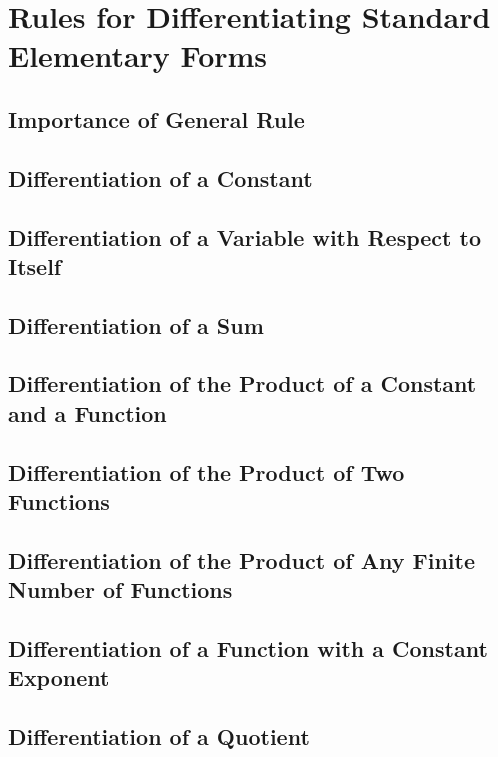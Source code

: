 \chapter{Rules for Differentiating Standard Elementary Forms}
\label{ch:05}

\section{Importance of General Rule}
\label{sec:05:01}

\section{Differentiation of a Constant}
\label{sec:05:02}

\section{Differentiation of a Variable with Respect to Itself}
\label{sec:05:03}

\section{Differentiation of a Sum}
\label{sec:05:04}

\section{Differentiation of the Product of a Constant and a Function}
\label{sec:05:05}

\section{Differentiation of the Product of Two Functions}
\label{sec:05:06}

\section{Differentiation of the Product of Any Finite Number of Functions}
\label{sec:05:07}

\section{Differentiation of a Function with a Constant Exponent}
\label{sec:05:08}

\section{Differentiation of a Quotient}
\label{sec:05:09}

